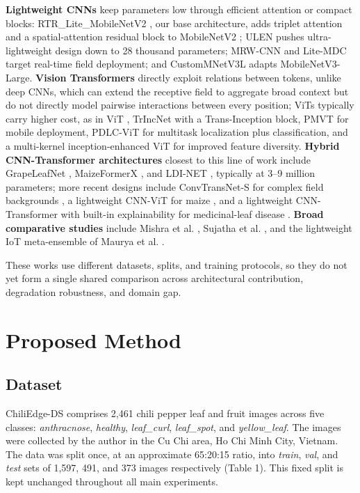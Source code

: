 \textbf{Lightweight CNNs} keep parameters low through efficient attention or compact blocks: RTR\_Lite\_MobileNetV2 \cite{duhan2025}, our base architecture, adds triplet attention \cite{misra2021} and a spatial-attention residual block to MobileNetV2 \cite{sandler2018}; ULEN \cite{wang2023} pushes ultra-lightweight design down to 28 thousand parameters; MRW-CNN \cite{joseph2024} and Lite-MDC \cite{bhagat2024} target real-time field deployment; and CustomMNetV3L \cite{rahaman2026} adapts MobileNetV3-Large. \textbf{Vision Transformers} directly exploit relations between tokens, unlike deep CNNs, which can extend the receptive field to aggregate broad context but do not directly model pairwise interactions between every position; ViTs typically carry higher cost, as in ViT \cite{ali2025}, TrIncNet \cite{gole2023} with a Trans-Inception block, PMVT \cite{li2023} for mobile deployment, PDLC-ViT \cite{hemalatha2024} for multitask localization plus classification, and a multi-kernel inception-enhanced ViT \cite{hassan2025} for improved feature diversity. \textbf{Hybrid CNN-Transformer architectures} closest to this line of work include GrapeLeafNet \cite{karthik2024}, MaizeFormerX \cite{rahman2026}, and LDI-NET \cite{yangB2024}, typically at 3--9 million parameters; more recent designs include ConvTransNet-S for complex field backgrounds \cite{jia2025}, a lightweight CNN-ViT for maize \cite{mehdipour2026}, and a lightweight CNN-Transformer with built-in explainability for medicinal-leaf disease \cite{ahmmed2026}. \textbf{Broad comparative studies} include Mishra et al. \cite{mishra2026}, Sujatha et al. \cite{sujatha2025}, and the lightweight IoT meta-ensemble of Maurya et al. \cite{maurya2024}.

These works use different datasets, splits, and training protocols, so they do not yet form a single shared comparison across architectural contribution, degradation robustness, and domain gap.

\FloatBarrier

\section{Proposed Method}\label{proposed-method}

\subsection{Dataset}\label{dataset}

ChiliEdge-DS comprises 2,461 chili pepper leaf and fruit images across five classes: \emph{anthracnose}, \emph{healthy}, \emph{leaf\_curl}, \emph{leaf\_spot}, and \emph{yellow\_leaf}. The images were collected by the author in the Cu Chi area, Ho Chi Minh City, Vietnam. The data was split once, at an approximate 65:20:15 ratio, into \emph{train}, \emph{val}, and \emph{test} sets of 1,597, 491, and 373 images respectively (Table 1). This fixed split is kept unchanged throughout all main experiments.

